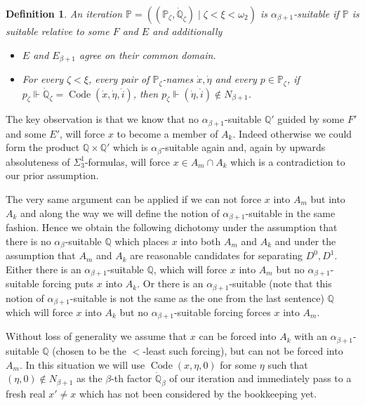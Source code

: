 \documentclass[a4paper,11pt]{article}
\newtheorem{definition}[theorem]{Definition}
\newcommand{\forceP}{\mathbb{P}}
\newcommand{\forceQ}{\mathbb{Q}}
\begin{document}
{\begin{definition}
An iteration $\forceP=((\forceP_{\zeta},\dot{\forceQ}_{\zeta}) \mid \zeta < \xi < \omega_2)$ is $\alpha_{\beta+1}$-suitable if $\forceP$ is suitable relative to some $F$ and $E$ and additionally
\begin{itemize}
\item $E$ and $E_{\beta+1}$ agree on their common domain.
\item For every $\zeta< \xi$, every pair of $\forceP_{\zeta}$-names $\dot{x}, \dot{\eta}$ and every $p \in \forceP_{\zeta}$, if $p_{\zeta} \Vdash \dot{\forceQ}_{\zeta} =\operatorname{Code} (\dot{x},\dot{\eta},\dot{i})$, then $p_{\zeta} \Vdash (\dot{\eta},\dot{i}) \notin N_{\beta+1}$.
\end{itemize}  
\end{definition}

The key observation is that we know that no $\alpha_{\beta+1}$-suitable $\forceQ'$ guided by some $F'$ and some $E'$,  will force $x$ to become a member of $A_k$. Indeed otherwise we could form the product $\forceQ \times \forceQ'$ which is $\alpha_{\beta}$-suitable again and, again by upwards absoluteness of $\Sigma^1_3$-formulas, will force $x \in A_m \cap A_k$ which is a contradiction to our prior assumption. 

The very same argument can be applied if we can not force $x$ into $A_m$ but into $A_k$ and along the way we will define the notion of $\alpha_{\beta+1}$-suitable in the same fashion. Hence we obtain the following dichotomy under the assumption that there is no $\alpha_{\beta}$-suitable $\forceQ$ which places $x$ into both $A_m$ and $A_k$ and under the assumption that $A_m$ and $A_k$ are reasonable candidates for separating $D^0,D^1$. Either there is an $\alpha_{\beta+1}$-suitable $\forceQ$, which will force 
$x$ into $A_m$ but no $\alpha_{\beta+1}$-suitable forcing puts $x$ into $A_k$. Or there is an $\alpha_{\beta+1}$-suitable (note that this notion of $\alpha_{\beta+1}$-suitable is not the same as the one from the last sentence) $\forceQ$ which  will force $x$ into $A_k$ but no $\alpha_{\beta+1}$-suitable forcing forces $x$ into $A_m$.

Without loss of generality we assume that $x$ can be forced into $A_k$ with an $\alpha_{\beta+1}$-suitable $\forceQ$ (chosen to be the $<$-least such forcing), but can not be forced into $A_m$. In this situation we will use $\operatorname{Code} (x,\eta, 0)$ for some $\eta$ such that $(\eta,0) \notin N_{\beta+1}$ as the $\beta$-th factor $\dot{\forceQ}_{\beta}$ of our iteration and immediately pass to a fresh real $x' \ne x$ which has not been considered by the bookkeeping yet. 

}
\end{document}
